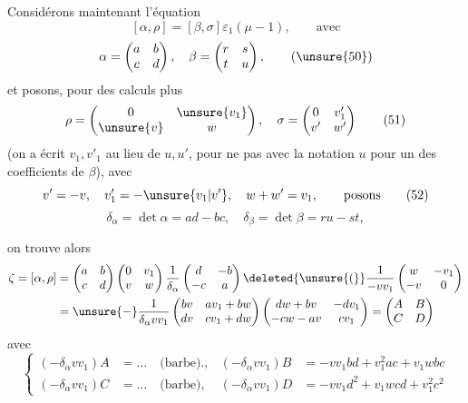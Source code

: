 Considérons maintenant l'équation
\[
[\alpha,\rho]=[\beta,\sigma]\varepsilon_1(\mu-1),\qquad\text{avec} \tag{49}
\]
\[
\alpha=\begin{pmatrix}a&b\\c&d\end{pmatrix},\quad
\beta=\begin{pmatrix}r&s\\t&u\end{pmatrix}, \tag{\unsure{50}}
\]
et posons, pour des calculs plus 
\[
\rho=\begin{pmatrix}0&\unsure{v_1}\\\unsure{v}&w\end{pmatrix},\quad
\sigma=\begin{pmatrix}0&v'_1\\v'&w'\end{pmatrix} \tag{51}
\]
(on a écrit $v_1,v'_1$ au lieu de $u,u'$, pour ne pas  avec la notation $u$ pour un des coefficients de $\beta$), avec
\[
v'=-v,\quad v'_1=-\unsure{v_1|v'},\quad w+w'=v_1,\qquad\text{posons} \tag{52}
\]
\[
\delta_\alpha=\det\alpha=ad-bc,\quad
\delta_\beta=\det\beta=ru-st,
\tag{53}
\]


on trouve alors
\[
\begin{aligned}
\zeta=[\alpha,\rho]
&=\begin{pmatrix}a&b\\c&d\end{pmatrix}
\begin{pmatrix}0&v_1\\v&w\end{pmatrix}
\frac1{\delta_\alpha}\begin{pmatrix}d&-b\\-c&a\end{pmatrix}
\deleted{\unsure{(}}\frac1{-vv_1}\begin{pmatrix}w&-v_1\\-v&0\end{pmatrix}\\
&=\unsure{-}\frac1{\delta_\alpha vv_1}
\begin{pmatrix}bv&av_1+bw\\dv&cv_1+dw\end{pmatrix}
\begin{pmatrix}dw+bv&-dv_1\\-cw-av&cv_1\end{pmatrix}
=\begin{pmatrix}A&B\\C&D\end{pmatrix}
\end{aligned}
\]
avec
\[
\left\{\begin{aligned}
(-\delta_\alpha vv_1)A&=\ldots\quad\text{(barbe).},
&(-\delta_\alpha vv_1)B&=-vv_1bd+v_1^2ac+v_1wbc\\
(-\delta_\alpha vv_1)C&=\ldots\quad\text{(barbe)},
&(-\delta_\alpha vv_1)D&=-vv_1d^2+v_1wcd+v_1^2c^2
\end{aligned}\right. \tag{54}
\]

